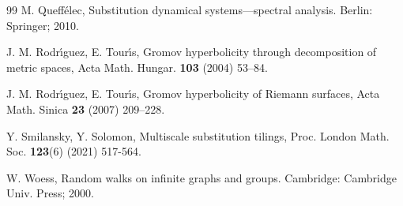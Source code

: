 \documentclass[reqno]{amsart}
\theoremstyle{plain}
\numberwithin{equation}{section}
\begin{document}
\begin{thebibliography}{99}
 M. Queff\'{e}lec, Substitution dynamical
systems---spectral analysis. Berlin: Springer; 2010.

 J. M. Rodr\'{\i}guez, E. Tour\'{\i}s, Gromov
hyperbolicity through decomposition of metric spaces, Acta Math. Hungar. 
\textbf{103} (2004) 53--84.

 J. M. Rodr\'{\i}guez, E. Tour\'{\i}s, Gromov
hyperbolicity of Riemann surfaces, Acta Math. Sinica \textbf{23} (2007)
209--228.

 Y. Smilansky, Y. Solomon, Multiscale substitution
tilings, Proc. London Math. Soc. \textbf{123}(6) (2021) 517-564.

 W. Woess, Random walks on infinite graphs and groups.
Cambridge: Cambridge Univ. Press; 2000.
\end{thebibliography}
\end{document}
